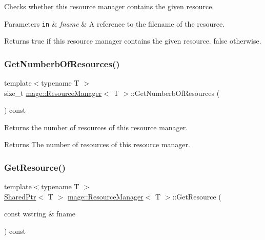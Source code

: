Checks whether this resource manager contains the given resource.


\begin{DoxyParams}[1]{Parameters}
\mbox{\tt in}  & {\em fname} & A reference to the filename of the resource. \\
\hline
\end{DoxyParams}
\begin{DoxyReturn}{Returns}
{\ttfamily true} if this resource manager contains the given resource. {\ttfamily false} otherwise. 
\end{DoxyReturn}
\hypertarget{classmage_1_1_resource_manager_a1872b087dac1794746b320c6ece63fd8}{}\label{classmage_1_1_resource_manager_a1872b087dac1794746b320c6ece63fd8} 
\subsubsection{\texorpdfstring{Get\+Numberb\+Of\+Resources()}{GetNumberbOfResources()}}
{\footnotesize\ttfamily template$<$typename T $>$ \\
size\+\_\+t \hyperlink{classmage_1_1_resource_manager}{mage\+::\+Resource\+Manager}$<$ T $>$\+::Get\+Numberb\+Of\+Resources (\begin{DoxyParamCaption}{ }\end{DoxyParamCaption}) const}

Returns the number of resources of this resource manager.

\begin{DoxyReturn}{Returns}
The number of resources of this resource manager. 
\end{DoxyReturn}
\hypertarget{classmage_1_1_resource_manager_a8196c2ab8b01b5afbae191ea342141e3}{}\label{classmage_1_1_resource_manager_a8196c2ab8b01b5afbae191ea342141e3} 
\subsubsection{\texorpdfstring{Get\+Resource()}{GetResource()}}
{\footnotesize\ttfamily template$<$typename T $>$ \\
\hyperlink{namespacemage_a1e01ae66713838a7a67d30e44c67703e}{Shared\+Ptr}$<$ T $>$ \hyperlink{classmage_1_1_resource_manager}{mage\+::\+Resource\+Manager}$<$ T $>$\+::Get\+Resource (\begin{DoxyParamCaption}\item[{const wstring \&}]{fname }\end{DoxyParamCaption}) const}

